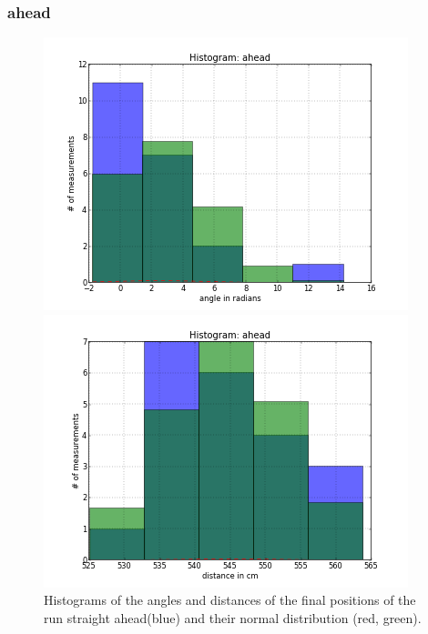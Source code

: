 \documentclass{scrartcl}
\begin{document}
\subsubsection{ahead}
\begin{figure}[H]
\centering
\begin{minipage}{.5\textwidth}
  \centering
  \includegraphics[width=1.0\linewidth]{img/Angles_ahead_f.png}
\end{minipage}%
\begin{minipage}{.5\textwidth}
  \centering
  \includegraphics[width=1.0\linewidth]{img/Distances_ahead_f.png}
\end{minipage}
\caption{Histograms of the angles and distances of the final positions of the run straight ahead(blue) and their normal distribution (red, green).}
\end{figure}
\end{document}
